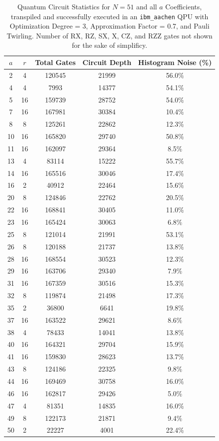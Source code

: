 \documentclass[conference,twoside]{IEEEtran}
\begin{document}
\begin{table}[h]
\centering
\caption{Quantum Circuit Statistics for $N=51$ and all $a$ Coefficients, transpiled and successfully executed in an \texttt{ibm\_aachen} QPU with Optimization Degree = 3, Approximation Factor = 0.7, and Pauli Twirling. Number of RX, RZ, SX, X, CZ, and RZZ gates not shown for the sake of simplificy.}
\label{tab:QC_statistics_N=51_all_a}
\begin{tabular}{c c c c c}
\toprule
\textbf{$a$} & \textbf{$r$} & \textbf{Total Gates} & \textbf{Circuit Depth} & \textbf{Histogram Noise (\%)} \\
\midrule
2 & 4 & 120545 & 21999 & 56.0\% \\
4 & 4 & 7993 & 14377 & 54.1\% \\
5 & 16 & 159739 & 28752 & 54.0\% \\
7 & 16 & 167981 & 30384 & 10.4\% \\
8 & 8 & 125261 & 22862 & 12.3\% \\
10 & 16 & 165820 & 29740 & 50.8\% \\
11 & 16 & 162097 & 29364 & 8.5\% \\
13 & 4 & 83114 & 15222 & 55.7\% \\
14 & 16 & 165516 & 30046 & 17.4\% \\
16 & 2 & 40912 & 22464 & 15.6\% \\
20 & 8 & 124846 & 22762 & 20.5\% \\
22 & 16 & 168841 & 30405 & 11.0\% \\
23 & 16 & 165424 & 30063 & 6.8\% \\
25 & 8 & 121014 & 21991 & 53.1\% \\
26 & 8 & 120188 & 21737 & 13.8\% \\
28 & 16 & 168554 & 30523 & 12.3\% \\
29 & 16 & 163706 & 29340 & 7.9\% \\
31 & 16 & 167359 & 30516 & 15.3\% \\
32 & 8 & 119874 & 21498 & 17.3\% \\
35 & 2 & 36800 & 6641 & 19.8\% \\
37 & 16 & 163522 & 29621 & 8.6\% \\
38 & 4 & 78433 & 14041 & 13.8\% \\
40 & 16 & 164321 & 29704 & 15.9\% \\
41 & 16 & 159830 & 28623 & 13.7\% \\
43 & 8 & 124186 & 22325 & 9.8\% \\
44 & 16 & 169469 & 30758 & 16.0\% \\
46 & 16 & 162817 & 29426 & 5.0\% \\
47 & 4 & 81351 & 14835 & 16.0\% \\
49 & 8 & 122173 & 21871 & 9.4\% \\
50 & 2 & 22227 & 4001 & 22.4\% \\
\bottomrule
\end{tabular}
\end{table}
\end{document}
